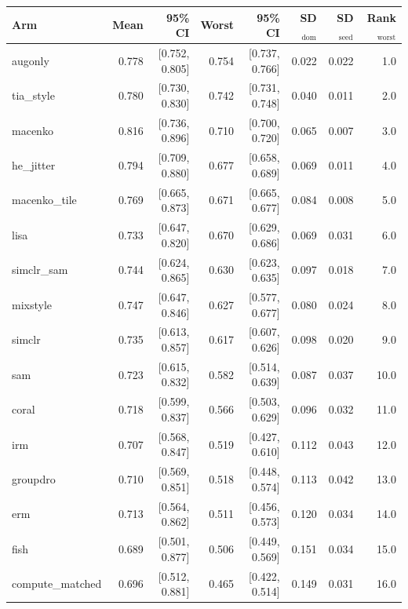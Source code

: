 \begin{tabular}{lrrrrrrr}
\toprule
Arm & Mean & 95\% CI & Worst & 95\% CI & SD$_\text{dom}$ & SD$_\text{seed}$ & Rank$_\text{worst}$ \\
\midrule
augonly & 0.778 & [0.752, 0.805] & 0.754 & [0.737, 0.766] & 0.022 & 0.022 & 1.0 \\
tia\_style & 0.780 & [0.730, 0.830] & 0.742 & [0.731, 0.748] & 0.040 & 0.011 & 2.0 \\
macenko & 0.816 & [0.736, 0.896] & 0.710 & [0.700, 0.720] & 0.065 & 0.007 & 3.0 \\
he\_jitter & 0.794 & [0.709, 0.880] & 0.677 & [0.658, 0.689] & 0.069 & 0.011 & 4.0 \\
macenko\_tile & 0.769 & [0.665, 0.873] & 0.671 & [0.665, 0.677] & 0.084 & 0.008 & 5.0 \\
lisa & 0.733 & [0.647, 0.820] & 0.670 & [0.629, 0.686] & 0.069 & 0.031 & 6.0 \\
simclr\_sam & 0.744 & [0.624, 0.865] & 0.630 & [0.623, 0.635] & 0.097 & 0.018 & 7.0 \\
mixstyle & 0.747 & [0.647, 0.846] & 0.627 & [0.577, 0.677] & 0.080 & 0.024 & 8.0 \\
simclr & 0.735 & [0.613, 0.857] & 0.617 & [0.607, 0.626] & 0.098 & 0.020 & 9.0 \\
sam & 0.723 & [0.615, 0.832] & 0.582 & [0.514, 0.639] & 0.087 & 0.037 & 10.0 \\
coral & 0.718 & [0.599, 0.837] & 0.566 & [0.503, 0.629] & 0.096 & 0.032 & 11.0 \\
irm & 0.707 & [0.568, 0.847] & 0.519 & [0.427, 0.610] & 0.112 & 0.043 & 12.0 \\
groupdro & 0.710 & [0.569, 0.851] & 0.518 & [0.448, 0.574] & 0.113 & 0.042 & 13.0 \\
erm & 0.713 & [0.564, 0.862] & 0.511 & [0.456, 0.573] & 0.120 & 0.034 & 14.0 \\
fish & 0.689 & [0.501, 0.877] & 0.506 & [0.449, 0.569] & 0.151 & 0.034 & 15.0 \\
compute\_matched & 0.696 & [0.512, 0.881] & 0.465 & [0.422, 0.514] & 0.149 & 0.031 & 16.0 \\
\bottomrule
\end{tabular}
